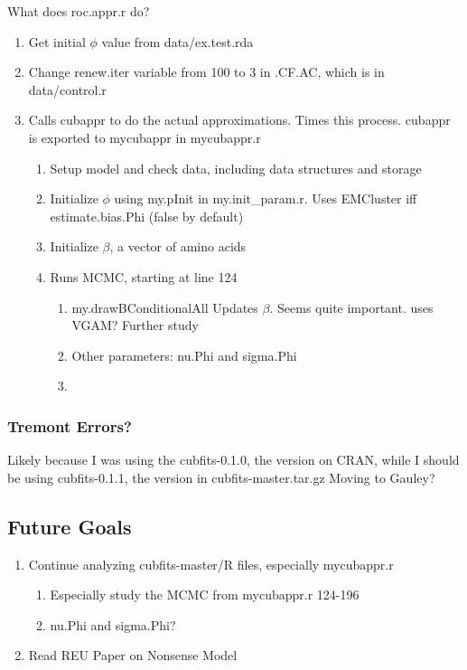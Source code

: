 What does roc.appr.r do?
\begin{enumerate}	%
\item Get initial $\phi$ value from data/ex.test.rda
\item Change renew.iter variable from 100 to 3 in .CF.AC, which is in data/control.r
\item Calls cubappr to do the actual approximations. Times this process. cubappr is exported to mycubappr in mycubappr.r
	\begin{enumerate}	%
	\item Setup model and check data, including data structures and storage
	\item Initialize $\phi$ using my.pInit in my.init\_param.r. Uses EMCluster iff estimate.bias.Phi (false by default)
	\item Initialize $\beta$, a vector of amino acids
	\item Runs MCMC, starting at line 124
		\begin{enumerate}	%
		\item my.drawBConditionalAll 
Updates $\beta$. Seems quite important. uses VGAM? Further study
		\item Other parameters:  nu.Phi and sigma.Phi
		\item 
		\end{enumerate}		%


	\end{enumerate} 	%
\end{enumerate}		%

\subsubsection{Tremont Errors?}
Likely because I was using the cubfits-0.1.0, the version on CRAN, while I should be using cubfits-0.1.1, the version in cubfits-master.tar.gz
Moving to Gauley?

\subsection{Future Goals}
\begin{enumerate}
\item Continue analyzing cubfits-master/R files, especially mycubappr.r 
\begin{enumerate}
\item Especially study the MCMC from mycubappr.r 124-196
\item nu.Phi and sigma.Phi?
\end{enumerate}

\item Read REU Paper on Nonsense Model
\end{enumerate}

